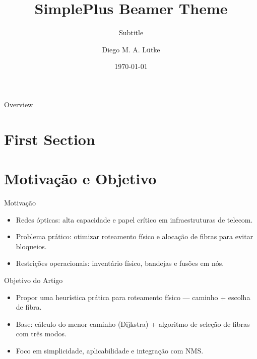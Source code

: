 \documentclass[aspectratio=169,xcolor=dvipsnames]{beamer}
\title{SimplePlus Beamer Theme}
\subtitle{Subtitle}
\author{Diego M. A. Lütke}
\institute
{
    Department of Computer Science and Information Engineering \\
    National Taiwan University
}
\date{\today} %
\begin{document}
\begin{frame}
    \titlepage
\end{frame}

\begin{frame}{Overview}
    \tableofcontents
\end{frame}

\section{First Section}

\section{Motivação e Objetivo}
\begin{frame}{Motivação}
  \begin{itemize}
    \item Redes ópticas: alta capacidade e papel crítico em infraestruturas de telecom.
    \item Problema prático: otimizar roteamento físico e alocação de fibras para evitar bloqueios.
    \item Restrições operacionais: inventário físico, bandejas e fusões em nós.
  \end{itemize}
\end{frame}

\begin{frame}{Objetivo do Artigo}
  \begin{itemize}
    \item Propor uma heurística prática para roteamento físico — caminho + escolha de fibra.
    \item Base: cálculo do menor caminho (Dijkstra) + algoritmo de seleção de fibras com três modos.
    \item Foco em simplicidade, aplicabilidade e integração com NMS.
  \end{itemize}
\end{frame}
\end{document}
